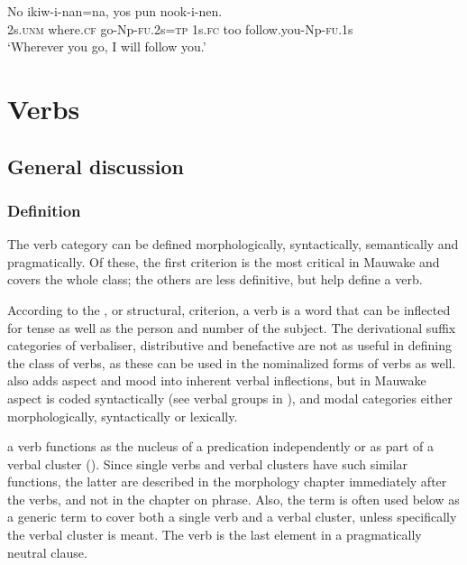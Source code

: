 \ea%
\label{ex:3:x1869}
\gll No  ikiw-i-nan=na, yos pun nook-i-nen. \\
2s.\textsc{unm} where.\textsc{cf} go-Np-\textsc{fu}.2s=\textsc{tp} 1s.\textsc{fc} too follow.you-Np-\textsc{fu}.1s\\
\glt`Wherever you go, I will follow you.'
\z

\section{Verbs}\label{sec:3:8}
{}
\subsection{General discussion}
{}
\subsubsection{Definition}
{}
The verb category can be defined morphologically, syntactically, semantically and pragmatically. Of these, the first criterion is the most critical in Mauwake and covers the whole class; the others are less definitive, but help define a  verb.

According to the , or structural, criterion, a verb is a word that can be inflected for tense as well as the person and number of the subject. The derivational suffix categories of verbaliser, distributive and benefactive are not as useful in defining the class of verbs, as these can be used in the nominalized forms of verbs as well. \citet[190]{Anderson1985b} also adds aspect and mood into inherent verbal inflections, but in Mauwake aspect is coded syntactically (see verbal groups in ), and modal categories either morphologically, syntactically or lexically.

 a verb functions as the nucleus of a predication independently or as part of a verbal cluster (). Since single verbs and verbal clusters have such similar functions, the latter are described in the morphology chapter immediately after the verbs, and not in the chapter on phrase. Also, the term  is often used below as a generic term to cover both a single verb and a verbal cluster, unless specifically the verbal cluster is meant. The verb is the last element in a pragmatically neutral clause.

